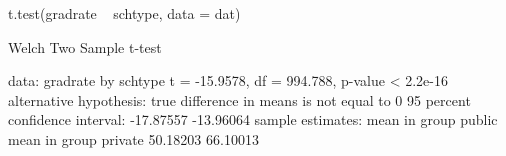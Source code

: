 \begin{Schunk}
\begin{Sinput}
 t.test(gradrate ~ schtype, data = dat)
\end{Sinput}
\begin{Soutput}
	Welch Two Sample t-test

data:  gradrate by schtype
t = -15.9578, df = 994.788, p-value < 2.2e-16
alternative hypothesis: true difference in means is not equal to 0
95 percent confidence interval:
 -17.87557 -13.96064
sample estimates:
 mean in group public mean in group private 
             50.18203              66.10013 
\end{Soutput}
\end{Schunk}
